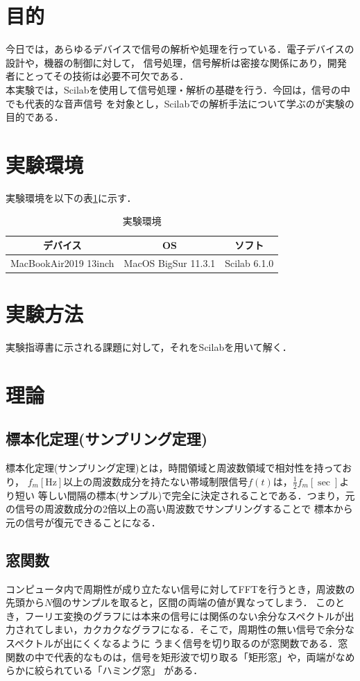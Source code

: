 \documentclass[a4paper,11pt]{jsarticle}
\begin{document}
\section{目的}
  今日では，あらゆるデバイスで信号の解析や処理を行っている．電子デバイスの設計や，機器の制御に対して，
  信号処理，信号解析は密接な関係にあり，開発者にとってその技術は必要不可欠である．\\
  本実験では，Scilabを使用して信号処理・解析の基礎を行う．今回は，信号の中でも代表的な音声信号
  を対象とし，Scilabでの解析手法について学ぶのが実験の目的である．


\section{実験環境}
  実験環境を以下の表\ref{T:emviroment}に示す．
  \begin{table}[H]
    \begin{center}
      \caption{実験環境}
      \begin{tabular}{|c|c|c|}  \hline 
        デバイス &  OS & ソフト \\ \hline 
        MacBookAir2019 13inch &  MacOS BigSur 11.3.1 & Scilab 6.1.0 \\ \hline
      \end{tabular}
      \label{T:emviroment}
    \end{center}
  \end{table}

\section{実験方法}
  実験指導書\cite{text}に示される課題に対して，それをScilabを用いて解く．

\section{理論}
  \subsection{標本化定理(サンプリング定理)}
    標本化定理(サンプリング定理)\cite{sampling}とは，時間領域と周波数領域で相対性を持っており，
    $f_m[\si{\hertz}]$以上の周波数成分を持たない帯域制限信号$f(t)$は，$\frac{1}{2}f_m[\si{\sec}]$より短い
    等しい間隔の標本(サンプル)で完全に決定されることである．つまり，元の信号の周波数成分の2倍以上の高い周波数でサンプリングすることで
    標本から元の信号が復元できることになる．

  \subsection{窓関数}
    コンピュータ内で周期性が成り立たない信号に対してFFTを行うとき，周波数の先頭から$N$個のサンプルを取ると，区間の両端の値が異なってしまう．
    このとき，フーリエ変換のグラフには本来の信号には関係のない余分なスペクトルが出力されてしまい，カクカクなグラフになる．そこで，周期性の無い信号で余分なスペクトルが出にくくなるように
    うまく信号を切り取るのが窓関数である．窓関数の中で代表的なものは，信号を矩形波で切り取る「矩形窓」や，両端がなめらかに絞られている「ハミング窓」
    がある．
\end{document}
